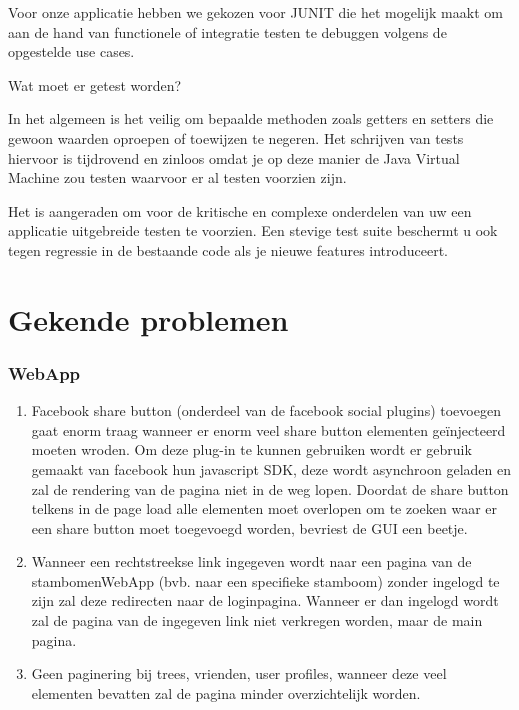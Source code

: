 \documentclass[pdftex,a4paper,12pt,twoside]{report}
\begin{document}
Voor onze applicatie hebben we gekozen voor JUNIT die het mogelijk maakt om aan de hand van functionele of integratie testen te debuggen volgens de opgestelde use cases.


Wat moet er getest worden?

In het algemeen is het veilig om bepaalde methoden zoals getters en setters die gewoon waarden oproepen of toewijzen te negeren. Het schrijven van tests hiervoor is tijdrovend en zinloos omdat je op deze manier de Java Virtual Machine zou testen waarvoor er al testen voorzien zijn.

Het is aangeraden om voor de kritische en complexe onderdelen van uw een applicatie uitgebreide testen te voorzien. Een stevige test suite beschermt u ook tegen regressie in de bestaande code als je nieuwe features introduceert.




\chapter{Gekende problemen}
\subsection{WebApp}
\begin{enumerate}
\item \label{it:first}Facebook share button (onderdeel van de facebook social plugins) toevoegen gaat enorm traag wanneer er enorm veel share button elementen geïnjecteerd moeten wroden.
Om deze plug-in te kunnen gebruiken wordt er gebruik gemaakt van facebook hun javascript SDK, deze wordt asynchroon geladen en zal de rendering van de pagina niet in de weg lopen.
Doordat de share button telkens in de page load alle elementen moet overlopen om te zoeken waar er een share button moet toegevoegd worden, bevriest de GUI een beetje.

\item \label{it:first}Wanneer een rechtstreekse link ingegeven wordt naar een pagina van de stambomenWebApp (bvb. naar een specifieke stamboom) zonder ingelogd te zijn zal deze redirecten naar de loginpagina. Wanneer er dan ingelogd wordt zal de pagina van de ingegeven link niet verkregen worden, maar de main pagina.

\item \label{it:first}Geen paginering bij trees, vrienden, user profiles, wanneer deze veel elementen bevatten zal de pagina minder overzichtelijk worden.
\end{enumerate}
\end{document}
